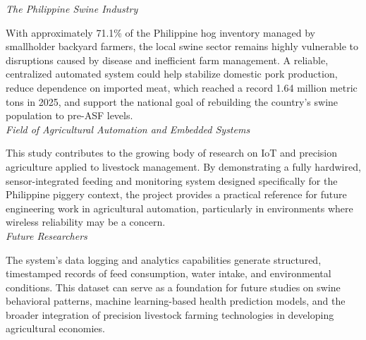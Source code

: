 \noindent\textit{The Philippine Swine Industry}

With approximately 71.1\% of the Philippine hog inventory managed by smallholder backyard farmers, the local swine sector remains highly vulnerable to disruptions caused by disease and inefficient farm management. A reliable, centralized automated system could help stabilize domestic pork production, reduce dependence on imported meat, which reached a record 1.64 million metric tons in 2025, and support the national goal of rebuilding the country's swine population to pre-ASF levels.
\\

\noindent\textit{Field of Agricultural Automation and Embedded Systems}

This study contributes to the growing body of research on IoT and precision agriculture applied to livestock management. By demonstrating a fully hardwired, sensor-integrated feeding and monitoring system designed specifically for the Philippine piggery context, the project provides a practical reference for future engineering work in agricultural automation, particularly in environments where wireless reliability may be a concern.
\\

\noindent\textit{Future Researchers}

The system's data logging and analytics capabilities generate structured, timestamped records of feed consumption, water intake, and environmental conditions. This dataset can serve as a foundation for future studies on swine behavioral patterns, machine learning-based health prediction models, and the broader integration of precision livestock farming technologies in developing agricultural economies.

